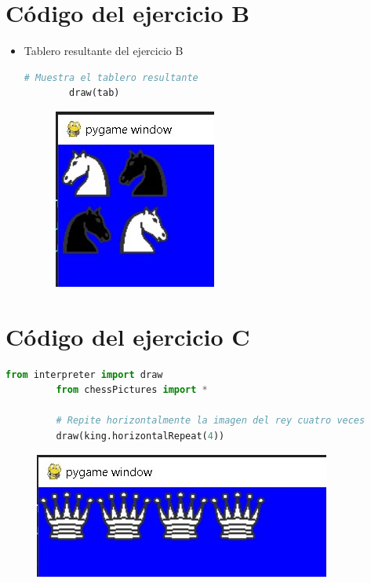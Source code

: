 \documentclass{article}
\begin{document}
        \section{Código del ejercicio B}
		\begin{itemize}
        \begin{lstlisting}[language=Python, caption={Código del ejercicio B}]
        from chessPictures import *
        from interpreter import draw

        tab = knight
       # Une el caballo con su inverso
        tab = Picture.join(tab, Picture.negative(knight))
       # Refleja verticalmente y muestra el tablero resultante
       tab = Picture.up(Picture.verticalMirror(tab), tab)
       \end{lstlisting}
       \item Tablero resultante del ejercicio B
        \begin{lstlisting}[language=Python, caption={Tablero resultante del ejercicio B}]
        # Muestra el tablero resultante
        draw(tab)
        \end{lstlisting}
		\begin{figure}[H]
			\centering
			\includegraphics[scale=0.3]{img/ejercicio2b.jpg}
		\end{figure}
	\end{itemize} 
        \section{Código del ejercicio C}
		\begin{itemize}
        \begin{lstlisting}[language=Python, caption={Código del ejercicio C}]
         from interpreter import draw
         from chessPictures import *

         # Repite horizontalmente la imagen del rey cuatro veces
         draw(king.horizontalRepeat(4))
         \end{lstlisting}
		 \begin{figure}[H]
			\centering
			\includegraphics[scale=0.3]{img/ejercicio2c.jpg}
		\end{figure}
	\end{itemize} 
\end{document}
